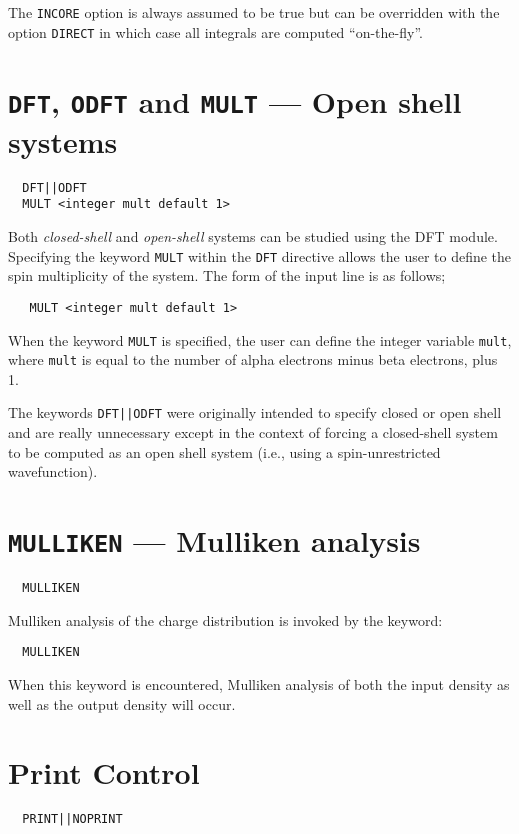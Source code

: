 The \verb+INCORE+ option is always assumed to be true but can be
overridden with the option \verb+DIRECT+ in which case all integrals
are computed ``on-the-fly''.

\fussy

\section{{\tt DFT}, {\tt ODFT} and {\tt MULT} --- Open shell systems}
\begin{verbatim}
  DFT||ODFT
  MULT <integer mult default 1>
\end{verbatim}

Both {\sl closed-shell} and {\sl open-shell} systems can be studied using
the DFT module.  Specifying the keyword \verb+MULT+ within the \verb+DFT+
directive allows the user to define the spin multiplicity of the system.
The form of the input line is as follows;
\begin{verbatim}
   MULT <integer mult default 1> 
\end{verbatim}
When the keyword \verb+MULT+ is specified, the user can define the integer
variable \verb+mult+, where \verb+mult+ is equal to the number of alpha 
electrons minus beta electrons, plus 1.

The keywords \verb+DFT||ODFT+ were originally intended to specify
closed or open shell and are really unnecessary except in the context
of forcing a closed-shell system to be computed as an open shell
system (i.e., using a spin-unrestricted wavefunction).

\section{{\tt MULLIKEN} --- Mulliken analysis}
\begin{verbatim}
  MULLIKEN
\end{verbatim}

Mulliken analysis of the charge distribution is invoked by the keyword:
\begin{verbatim}
  MULLIKEN
\end{verbatim}
When this keyword is encountered, Mulliken analysis of both the input 
density as well as the output density will occur.

\section{Print Control}
\begin{verbatim}
  PRINT||NOPRINT
\end{verbatim}

